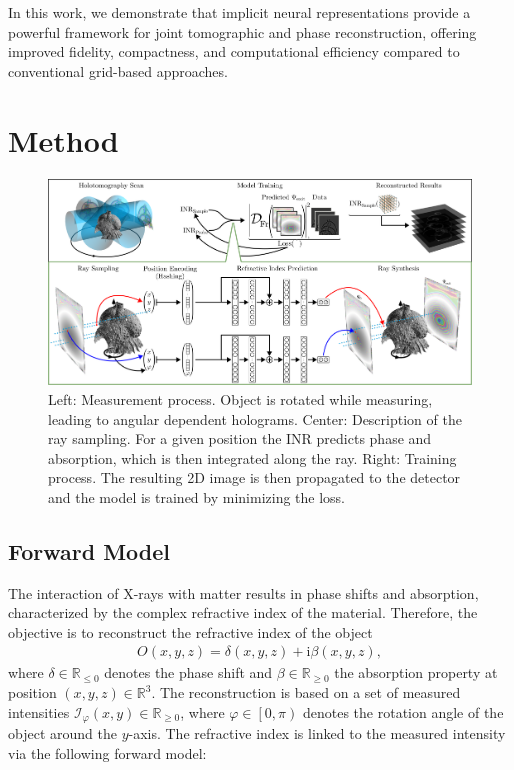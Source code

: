 \documentclass{article}
\begin{document}
In this work, we demonstrate that implicit neural representations provide a powerful framework for joint tomographic and phase reconstruction, offering improved fidelity, compactness, and computational efficiency compared to conventional grid-based approaches.
\section{Method}
\begin{figure}
	\centering
	\includegraphics[width=1\linewidth]{images/overview.png}
	\caption{Left: Measurement process.
		Object is rotated while measuring, leading to angular dependent holograms.
		Center: Description of the ray sampling.
		For a given position the INR predicts phase and absorption, which is then integrated along the ray.
		Right: Training process.
		The resulting 2D image is then propagated to the detector and the model is trained by minimizing the loss.
	}
	\label{fig:overiew}
\end{figure}

\subsection{Forward Model}
The interaction of X-rays with matter results in phase shifts and absorption, characterized by the complex refractive index of the material.
Therefore, the objective is to reconstruct the refractive index of the object  
\begin{align}
	O \left( x,y,z \right) = \delta \left( x,y,z \right) + \mathrm{i} \beta \left( x,y,z \right),
	\label{eq:refractive-index}
\end{align}
where $\delta \in \mathbb{R}_{\leq 0}$ denotes the phase shift and $\beta \in \mathbb{R}_{\geq 0}$ the absorption property at position $\left( x,y,z \right) \in \mathbb{R}^{3}$.  
The reconstruction is based on a set of measured intensities $\mathcal{I}_\varphi \left( x,y \right) \in \mathbb{R}_{\geq 0}$, where $\varphi \in \left[ 0, \pi \right)$ denotes the rotation angle of the object around the $y$-axis.  
The refractive index is linked to the measured intensity via the following forward model:
\end{document}
